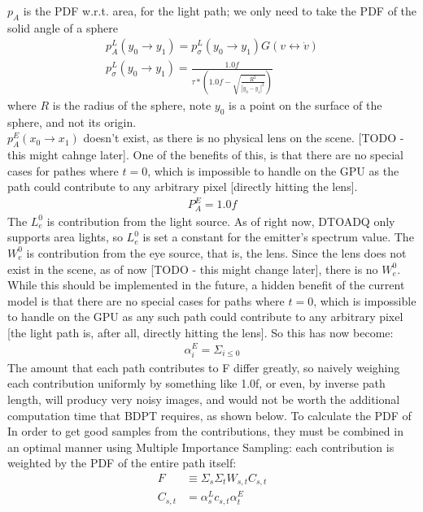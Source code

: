 \message{ !name(test.tex)}\documentclass{article}
\begin{document}
     $p_A$ is
    the PDF w.r.t. area, for the light path; we only need to take the PDF of the
    solid angle of a sphere
  \begin{align}
    p_A^L(y_0 \rightarrow y_1) = p_{\sigma}^L(y_0 \rightarrow y_1) G(v
    \leftrightarrow \dot{v})\\
    p_{\sigma}^L(y_0 \rightarrow y_1) = \frac{1.0f}{\tau * (1.0f -
    \sqrt{\frac{R^2}{|y_0 - y_1|^2}})}
  \end{align}
    where $R$ is the radius of the sphere, note $y_0$ is a point on the surface
    of the sphere, and not its origin.
    \\$p_A^E(x_0 \rightarrow x_1)$ doesn't exist, as there is no physical lens
    on the scene. [TODO - this might cahnge later]. One of the benefits of this,
    is that there are no special cases for pathes where $t = 0$, which is
    impossible to handle on the GPU as the path could contribute to any
    arbitrary pixel [directly hitting the lens].
  \begin{align}
    P_A^E = 1.0f
  \end{align}
    The $L^0_e$ is contribution from the light source. As of right now, DTOADQ
    only supports area lights, so $L^0_e$ is set a constant for the emitter's
    spectrum value.
    The $W_e^0$ is contribution from the eye source, that is, the lens. Since
    the lens does not exist in the scene, as of now [TODO - this might change
    later], there is no $W_e^0$. While this should be implemented in the future,
    a hidden benefit of the current model is that there are no special cases for
    paths where $t = 0$, which is impossible to handle on the GPU as any such
    path could contribute to any arbitrary pixel [the light path is, after all,
    directly hitting the lens]. So this has now become:
  \begin{align}
    \alpha_i^E = \Sigma_{i\leq 0} 
  \end{align}
  The amount that each path contributes to F differ greatly, so naively
  weighing each contribution uniformly by something like 1.0f, or even, by
  inverse path length, will producy very noisy images, and would not be
  worth the additional computation time that BDPT requires, as shown below.
  	 To calculate the PDF of 
  In order to get good
  samples from the contributions, they must be combined in an optimal manner
  using Multiple Importance Sampling: each contribution is weighted by the PDF
  of the entire path itself:
  \begin{align*}
    F &\equiv \Sigma_s\Sigma_tW_{s, t}C_{s, t}\\
    C_{s, t} &= \alpha^L_s c_{s, t} \alpha^E_t
  \end{align*}
\end{document}
